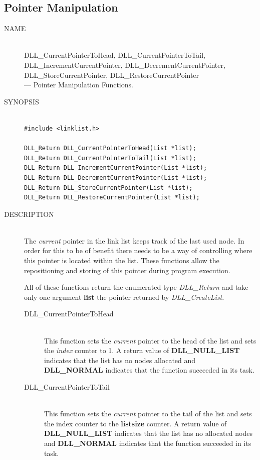 \documentclass[10pt,letterpaper,titlepage]{article}
\begin{document}
\subsection{Pointer Manipulation}
\begin{description}
\item[NAME]\quad\\
DLL\_CurrentPointerToHead, DLL\_CurrentPointerToTail,\\
DLL\_IncrementCurrentPointer, DLL\_DecrementCurrentPointer,\\
DLL\_StoreCurrentPointer, DLL\_RestoreCurrentPointer\\
  --- Pointer Manipulation Functions.

\item[SYNOPSIS]
\begin{verbatim}

#include <linklist.h>

DLL_Return DLL_CurrentPointerToHead(List *list);
DLL_Return DLL_CurrentPointerToTail(List *list);
DLL_Return DLL_IncrementCurrentPointer(List *list);
DLL_Return DLL_DecrementCurrentPointer(List *list);
DLL_Return DLL_StoreCurrentPointer(List *list);
DLL_Return DLL_RestoreCurrentPointer(List *list);
\end{verbatim}

\item[DESCRIPTION]\quad\\
The \emph{current} pointer in the link list keeps track of the last used node.  In order for this to be of benefit there needs to be a way of controlling where this pointer is located within the list.  These functions allow the repositioning and storing of this pointer during program execution.
\vspace{8pt}

\noindent
All of these functions return the enumerated type \emph{DLL\_Return} and take only one argument \textbf{list} the pointer returned by \emph{DLL\_CreateList}.

 \begin{description}
 \item[DLL\_CurrentPointerToHead]\quad\\
 This function sets the \emph{current} pointer to the head of the list and sets the \emph{index} counter to 1.  A return value of \textbf{DLL\_NULL\_LIST} indicates that the list has no nodes allocated and \textbf{DLL\_NORMAL} indicates that the function succeeded in its task.

 \item[DLL\_CurrentPointerToTail]\quad\\
 This function sets the \emph{current} pointer to the tail of the list and sets the index counter to the \textbf{listsize} counter.  A return value of \textbf{DLL\_NULL\_LIST} indicates that the list has no allocated nodes and \textbf{DLL\_NORMAL} indicates that the function succeeded in its task.


\end{description}
\end{description}
\end{document}
